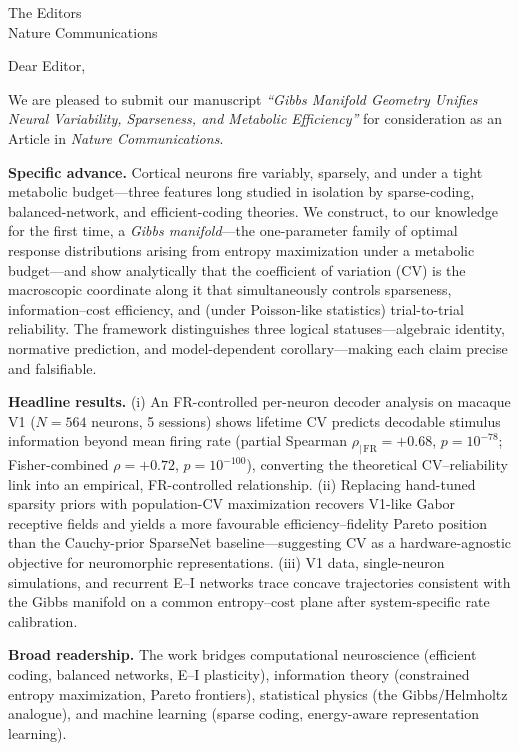 \documentclass[11pt]{letter}
\begin{document}
\begin{letter}{The Editors\\Nature Communications}

\opening{Dear Editor,}

We are pleased to submit our manuscript \textit{``Gibbs Manifold Geometry Unifies Neural Variability, Sparseness, and Metabolic Efficiency''} for consideration as an Article in \textit{Nature Communications}.

\textbf{Specific advance.}
Cortical neurons fire variably, sparsely, and under a tight metabolic budget---three features long studied in isolation by sparse-coding, balanced-network, and efficient-coding theories.  We construct, to our knowledge for the first time, a \textit{Gibbs manifold}---the one-parameter family of optimal response distributions arising from entropy maximization under a metabolic budget---and show analytically that the coefficient of variation (CV) is the macroscopic coordinate along it that simultaneously controls sparseness, information--cost efficiency, and (under Poisson-like statistics) trial-to-trial reliability.  The framework distinguishes three logical statuses---algebraic identity, normative prediction, and model-dependent corollary---making each claim precise and falsifiable.

\textbf{Headline results.}
(i) An FR-controlled per-neuron decoder analysis on macaque V1 ($N=564$ neurons, 5 sessions) shows lifetime CV predicts decodable stimulus information beyond mean firing rate (partial Spearman $\rho_{|\,\mathrm{FR}}=+0.68$, $p=10^{-78}$; Fisher-combined $\rho=+0.72$, $p=10^{-100}$), converting the theoretical CV--reliability link into an empirical, FR-controlled relationship.
(ii) Replacing hand-tuned sparsity priors with population-CV maximization recovers V1-like Gabor receptive fields and yields a more favourable efficiency--fidelity Pareto position than the Cauchy-prior SparseNet baseline---suggesting CV as a hardware-agnostic objective for neuromorphic representations.
(iii) V1 data, single-neuron simulations, and recurrent E--I networks trace concave trajectories consistent with the Gibbs manifold on a common entropy--cost plane after system-specific rate calibration.

\textbf{Broad readership.}
The work bridges computational neuroscience (efficient coding, balanced networks, E--I plasticity), information theory (constrained entropy maximization, Pareto frontiers), statistical physics (the Gibbs/Helmholtz analogue), and machine learning (sparse coding, energy-aware representation learning).


\end{letter}
\end{document}
